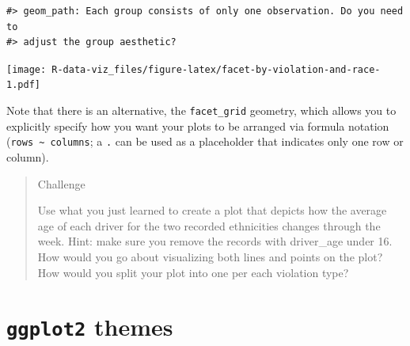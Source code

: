 \documentclass[]{book}
\newenvironment{Shaded}{\begin{snugshade}}{\end{snugshade}}
\newcommand{\KeywordTok}[1]{\textcolor[rgb]{0.13,0.29,0.53}{\textbf{#1}}}
\newcommand{\DataTypeTok}[1]{\textcolor[rgb]{0.13,0.29,0.53}{#1}}
\newcommand{\StringTok}[1]{\textcolor[rgb]{0.31,0.60,0.02}{#1}}
\newcommand{\OtherTok}[1]{\textcolor[rgb]{0.56,0.35,0.01}{#1}}
\newcommand{\OperatorTok}[1]{\textcolor[rgb]{0.81,0.36,0.00}{\textbf{#1}}}
\newcommand{\NormalTok}[1]{#1}
\theoremstyle{definition}
\theoremstyle{definition}
\theoremstyle{definition}
\theoremstyle{remark}
\begin{document}
\begin{Shaded}
\end{Shaded}

\begin{verbatim}
#> geom_path: Each group consists of only one observation. Do you need to
#> adjust the group aesthetic?
\end{verbatim}

\texttt{[image: R-data-viz\_files/figure-latex/facet-by-violation-and-race-1.pdf]}

Note that there is an alternative, the \texttt{facet\_grid} geometry,
which allows you to explicitly specify how you want your plots to be
arranged via formula notation
(\texttt{rows\ \textasciitilde{}\ columns}; a \texttt{.} can be used as
a placeholder that indicates only one row or column).

\begin{quote}
Challenge

Use what you just learned to create a plot that depicts how the average
age of each driver for the two recorded ethnicities changes through the
week. Hint: make sure you remove the records with driver\_age under 16.
How would you go about visualizing both lines and points on the plot?
How would you split your plot into one per each violation type?
\end{quote}

\section{\texorpdfstring{\textbf{\texttt{ggplot2}}
themes}{ggplot2 themes}}\label{ggplot2-themes}
\end{document}
